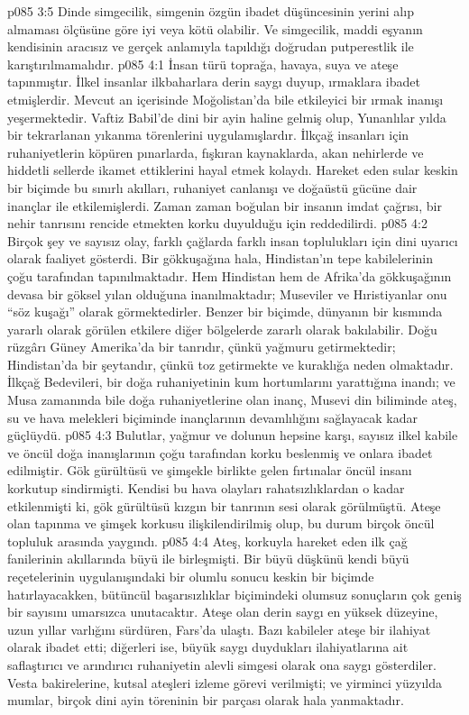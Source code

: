 \vs p085 3:5 Dinde simgecilik, simgenin özgün ibadet düşüncesinin yerini alıp almaması ölçüsüne göre iyi veya kötü olabilir. Ve simgecilik, maddi eşyanın kendisinin aracısız ve gerçek anlamıyla tapıldığı doğrudan putperestlik ile karıştırılmamalıdır.
\vs p085 4:1 İnsan türü toprağa, havaya, suya ve ateşe tapınmıştır. İlkel insanlar ilkbaharlara derin saygı duyup, ırmaklara ibadet etmişlerdir. Mevcut an içerisinde Moğolistan’da bile etkileyici bir ırmak inanışı yeşermektedir. Vaftiz Babil’de dini bir ayin haline gelmiş olup, Yunanlılar yılda bir tekrarlanan yıkanma törenlerini uygulamışlardır. İlkçağ insanları için ruhaniyetlerin köpüren pınarlarda, fışkıran kaynaklarda, akan nehirlerde ve hiddetli sellerde ikamet ettiklerini hayal etmek kolaydı. Hareket eden sular keskin bir biçimde bu sınırlı akılları, ruhaniyet canlanışı ve doğaüstü gücüne dair inançlar ile etkilemişlerdi. Zaman zaman boğulan bir insanın imdat çağrısı, bir nehir tanrısını rencide etmekten korku duyulduğu için reddedilirdi.
\vs p085 4:2 Birçok şey ve sayısız olay, farklı çağlarda farklı insan toplulukları için dini uyarıcı olarak faaliyet gösterdi. Bir gökkuşağına hala, Hindistan’ın tepe kabilelerinin çoğu tarafından tapınılmaktadır. Hem Hindistan hem de Afrika’da gökkuşağının devasa bir göksel yılan olduğuna inanılmaktadır; Museviler ve Hıristiyanlar onu “söz kuşağı” olarak görmektedirler. Benzer bir biçimde, dünyanın bir kısmında yararlı olarak görülen etkilere diğer bölgelerde zararlı olarak bakılabilir. Doğu rüzgârı Güney Amerika’da bir tanrıdır, çünkü yağmuru getirmektedir; Hindistan’da bir şeytandır, çünkü toz getirmekte ve kuraklığa neden olmaktadır. İlkçağ Bedevileri, bir doğa ruhaniyetinin kum hortumlarını yarattığına inandı; ve Musa zamanında bile doğa ruhaniyetlerine olan inanç, Musevi din biliminde ateş, su ve hava melekleri biçiminde inançlarının devamlılığını sağlayacak kadar güçlüydü.
\vs p085 4:3 Bulutlar, yağmur ve dolunun hepsine karşı, sayısız ilkel kabile ve öncül doğa inanışlarının çoğu tarafından korku beslenmiş ve onlara ibadet edilmiştir. Gök gürültüsü ve şimşekle birlikte gelen fırtınalar öncül insanı korkutup sindirmişti. Kendisi bu hava olayları rahatsızlıklardan o kadar etkilenmişti ki, gök gürültüsü kızgın bir tanrının sesi olarak görülmüştü. Ateşe olan tapınma ve şimşek korkusu ilişkilendirilmiş olup, bu durum birçok öncül topluluk arasında yaygındı.
\vs p085 4:4 Ateş, korkuyla hareket eden ilk çağ fanilerinin akıllarında büyü ile birleşmişti. Bir büyü düşkünü kendi büyü reçetelerinin uygulanışındaki bir olumlu sonucu keskin bir biçimde hatırlayacakken, bütüncül başarısızlıklar biçimindeki olumsuz sonuçların çok geniş bir sayısını umarsızca unutacaktır. Ateşe olan derin saygı en yüksek düzeyine, uzun yıllar varlığını sürdüren, Fars’da ulaştı. Bazı kabileler ateşe bir ilahiyat olarak ibadet etti; diğerleri ise, büyük saygı duydukları ilahiyatlarına ait saflaştırıcı ve arındırıcı ruhaniyetin alevli simgesi olarak ona saygı gösterdiler. Vesta bakirelerine, kutsal ateşleri izleme görevi verilmişti; ve yirminci yüzyılda mumlar, birçok dini ayin töreninin bir parçası olarak hala yanmaktadır.
